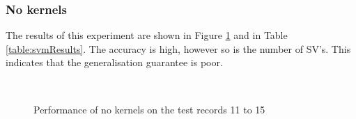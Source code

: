 \subsubsection{No kernels}
	The results of this experiment are shown in Figure \ref{fig:svmExperimentNoKernels} and in Table \ref{table:svmResults}. The accuracy is high, however so is the number of SV's. This indicates that the generalisation guarantee is poor.
	\begin{figure}[ht]
		\centering
		 \\
		\caption{Performance of no kernels on the test records 11 to 15}
		\label{fig:svmExperimentNoKernels}
	\end{figure}

